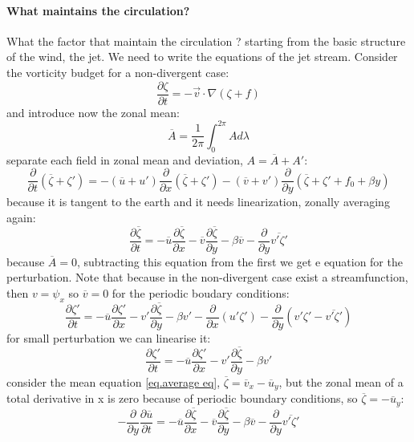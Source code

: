 \paragraph{What maintains the circulation?} What the factor that maintain the circulation ? starting from the basic structure of the wind, the jet. We need to write the equations of the jet stream. Consider the vorticity budget for a non-divergent case:
\begin{equation}
	\frac{\partial\zeta}{\partial t}=-\vec{v}\cdot\nabla(\zeta+f)
\end{equation}
and introduce now the zonal mean:
\begin{equation}\label{eq.zonal mean}
	\overline{A}=\frac{1}{2\pi}\int_0^{2\pi}Ad\lambda
\end{equation}
separate each field in zonal mean and deviation, $A=\overline{A}+A'$:
$$\frac{\partial}{\partial t}(\overline{\zeta}+\zeta')=-(\overline{u}+u')\frac{\partial}{\partial x}(\overline{\zeta}+\zeta')-(\overline{v}+v')\frac{\partial}{\partial y}(\overline{\zeta}+\zeta'+f_0+\beta y)$$
because it is tangent to the earth and it needs linearization, zonally averaging again:
\begin{equation}\label{eq.average eq}
	\frac{\partial\overline{\zeta}}{\partial t}=-\overline{u}\frac{
		\partial\overline{\zeta}
	}{\partial x}-\overline{v}\frac{\partial\overline{\zeta}}{\partial y}-\beta \overline{v}-\frac{\partial}{\partial y}\overline{v'\zeta'}
\end{equation}
because $\overline{A}=0$, subtracting this equation from the first we get e equation for the perturbation. Note that because in the non-divergent case exist a streamfunction, then $v=\psi_x$ so $\overline{v}=0$ for the periodic boudary conditions:
$$\frac{\partial\zeta'}{\partial t}=-\overline{u}\frac{\partial\zeta'}{\partial x}-v'\frac{\partial\overline{\zeta}}{\partial y}-\beta v'-\frac{\partial}{\partial x}(u'\zeta')-\frac{\partial}{\partial y}(v'\zeta'-\overline{v'\zeta'})$$ for small perturbation we can linearise it:
\begin{equation}
	\frac{\partial\zeta'}{\partial t}=-\overline{u}\frac{\partial\zeta'}{\partial x}-v'\frac{\partial\overline{\zeta}}{\partial y}-\beta v'
\end{equation}
consider the mean equation \ref{eq.average eq}, $\overline{\zeta}=\overline{v}_x-\overline{u}_y$, but the zonal mean of a total derivative in x is zero because of periodic boundary conditions, so $\overline{\zeta}=-\overline{u}_y$:
$$-\frac{\partial}{\partial y}\frac{\partial\overline{u}}{\partial t}=-\overline{u}\frac{\partial\overline{\zeta}}{\partial x}-\overline{v}\frac{\partial\overline{\zeta}}{\partial y}-\beta\overline{v}-\frac{\partial}{\partial y}\overline{v'\zeta'}$$
